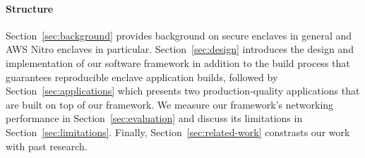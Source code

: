 \paragraph{Structure}

Section~\ref{sec:background} provides background on secure enclaves in general
and AWS Nitro enclaves in particular.  Section~\ref{sec:design} introduces the
design and implementation of our software framework in addition to the build
process that guarantees reproducible enclave application builds, followed by
Section~\ref{sec:applications} which presents two production-quality
applications that are built on top of our framework.  We measure our framework's
networking performance in Section~\ref{sec:evaluation} and discuss its
limitations in Section~\ref{sec:limitations}.  Finally,
Section~\ref{sec:related-work} constrasts our work with past research.
